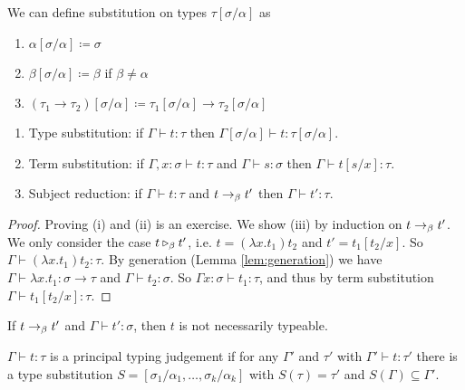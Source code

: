 \begin{boxdefi}
    We can define \alert{substitution} on types \alert{$\tau[\sigma/\alpha]$} as
    \begin{enumerate}
        \item $\alpha [\sigma / \alpha] \coloneq \sigma$
        \item $\beta [\sigma / \alpha] \coloneq \beta$ if $\beta \ne \alpha$
        \item $(\tau_1 \to \tau_2)[\sigma / \alpha] \coloneq \tau_1[\sigma / \alpha] \to \tau_2 [\sigma / \alpha]$
    \end{enumerate}
\end{boxdefi}

\begin{boxprop}
    \hfill
    \begin{enumerate}
        \item Type substitution: if $\Gamma \vdash t : \tau$ then $\Gamma [\sigma / \alpha] \vdash t : \tau [\sigma / \alpha]$.
        \item Term substitution: if $\Gamma, x : \sigma \vdash t : \tau$ and $\Gamma \vdash s : \sigma$ then $\Gamma \vdash t [s/x] : \tau$.
        \item Subject reduction: if $\Gamma \vdash t : \tau$ and $t \to_{\beta} t'$ then $\Gamma \vdash t' : \tau$.
    \end{enumerate}
\end{boxprop}
\begin{proof}
    Proving (i) and (ii) is an exercise.
    We show (iii) by induction on $t \to_{\beta} t'$.
    We only consider the case $t \triangleright_{\beta} t'$, i.e. $t = (\lambda x. t_1)t_2$ and $t ' = t_1[t_2/x]$.
    So $\Gamma \vdash (\lambda x. t_1) t_2 : \tau$.
    By generation (Lemma \ref{lem:generation}) we have $\Gamma \vdash \lambda x. t_1 : \sigma \to \tau$ and $\Gamma \vdash t_2 : \sigma$.
    So $\Gamma x : \sigma \vdash t_1 : \tau$, and thus by term substitution $\Gamma \vdash t_1[t_2/x] : \tau$.
\end{proof}

\begin{rem}
    If $t \to_{\beta} t'$ and $\Gamma \vdash t' : \sigma$, then $t$ is not necessarily typeable.
\end{rem}

\begin{boxdefi}
    $\Gamma \vdash t : \tau$ is a \alert{principal typing judgement} if for any $\Gamma'$ and $\tau'$ with $\Gamma' \vdash t : \tau'$ there is a type substitution $S = [\sigma_1 / \alpha_1, \dots, \sigma_k / \alpha_k]$ with $S(\tau) = \tau'$ and $S(\Gamma) \subseteq \Gamma'$.
\end{boxdefi}

